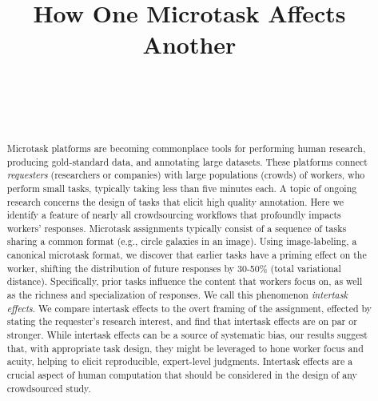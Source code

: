 \documentclass{sigchi}
\begin{document}
\title{How One Microtask Affects Another}

\author{%
  \\
  \\
  \\
}

\maketitle

\begin{abstract}
Microtask platforms are becoming commonplace tools for performing human
research, producing gold-standard data, and annotating large datasets.
These platforms connect \textit{requesters}
(researchers or companies) with large populations (crowds) of workers, who 
perform small tasks, typically taking less than five minutes each.
A topic of ongoing research concerns the design of tasks that elicit high
quality annotation.
Here we identify a feature of nearly all crowdsourcing 
workflows that profoundly impacts workers' responses.
Microtask assignments typically consist of a sequence 
of tasks sharing a common format (e.g., circle galaxies in an image). 
Using image-labeling, a canonical microtask format, we 
discover that earlier tasks have a priming effect on the worker, shifting 
the distribution of future responses by 30-50\% 
(total variational distance). 
Specifically, prior tasks influence the content that workers focus on, 
as well as the richness and specialization of responses. 
We call this phenomenon \textit{intertask effects}.
We compare intertask effects to the overt framing of the assignment, 
effected by stating the requester's research interest, 
and find that intertask effects are on par or stronger.
While intertask effects can be a source of systematic bias, 
our results suggest that, with appropriate task design, 
they might be leveraged to hone worker focus and acuity, 
helping to elicit reproducible, expert-level judgments.
Intertask effects are a crucial aspect of human computation that should be
considered in the design of any crowdsourced study.
\end{abstract}
\end{document}
